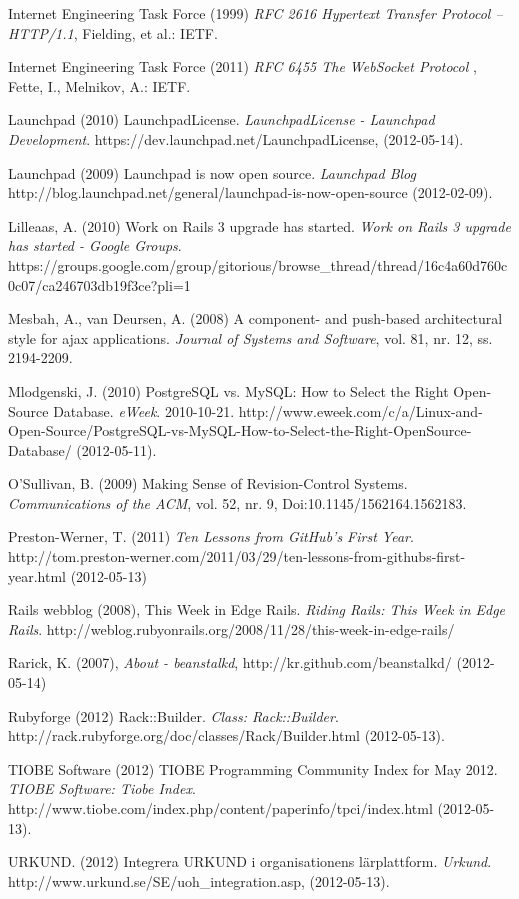 \begin{flushleft}
Internet Engineering Task Force (1999) \emph{RFC 2616 Hypertext Transfer Protocol -- HTTP/1.1}, Fielding, et al.: IETF.

Internet Engineering Task Force (2011) \emph{RFC 6455 The WebSocket Protocol} , Fette, I., Melnikov, A.: IETF.

Launchpad (2010) LaunchpadLicense. \emph{LaunchpadLicense - Launchpad Development}. https://dev.launchpad.net/LaunchpadLicense, (2012-05-14).

Launchpad (2009) Launchpad is now open source. \emph{Launchpad Blog} http://blog.launchpad.net/general/launchpad-is-now-open-source (2012-02-09).

Lilleaas, A. (2010) Work on Rails 3 upgrade has started. \emph{Work on Rails 3 upgrade has started - Google Groups}. https://groups.google.com/group/gitorious/browse\_thread/thread/16c4a60d760c0c07/ca246703db19f3ce?pli=1

Mesbah, A., van Deursen, A. (2008) A component- and push-based architectural style for ajax applications. \emph{Journal of Systems and Software}, vol. 81, nr. 12, ss. 2194-2209.

Mlodgenski, J. (2010) PostgreSQL vs. MySQL: How to Select the Right Open-Source Database. \emph{eWeek}. 2010-10-21.  http://www.eweek.com/c/a/Linux-and-Open-Source/PostgreSQL-vs-MySQL-How-to-Select-the-Right-OpenSource-Database/ (2012-05-11).

O'Sullivan, B. (2009) Making Sense of Revision-Control Systems. \emph{Communications of the ACM}, vol. 52, nr. 9, Doi:10.1145/1562164.1562183.

Preston-Werner, T. (2011) \emph{Ten Lessons from GitHub's First Year}. http://tom.preston-werner.com/2011/03/29/ten-lessons-from-githubs-first-year.html (2012-05-13)

Rails webblog (2008), This Week in Edge Rails. \emph{Riding Rails: This Week in Edge Rails}. http://weblog.rubyonrails.org/2008/11/28/this-week-in-edge-rails/

Rarick, K. (2007), \emph{About - beanstalkd}, http://kr.github.com/beanstalkd/ (2012-05-14)

Rubyforge (2012) Rack::Builder. \emph{Class: Rack::Builder}. http://rack.rubyforge.org/doc/classes/Rack/Builder.html (2012-05-13).

TIOBE Software (2012) TIOBE Programming Community Index for May 2012. \emph{TIOBE Software: Tiobe Index}. http://www.tiobe.com/index.php/content/paperinfo/tpci/index.html (2012-05-13).

URKUND. (2012) Integrera URKUND i organisationens lärplattform. \emph{Urkund}. http://www.urkund.se/SE/uoh\_integration.asp, (2012-05-13).


\end{flushleft}
